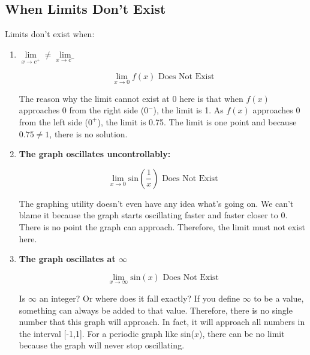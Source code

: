 \documentclass[../revisedMain.tex]{subfiles}
\begin{document}
\subsection{When Limits Don't Exist} Limits don't exist when:
\begin{enumerate}
\item \textbf{$\lim\limits_{x\to c^+} \neq \lim\limits_{x\to c^-}$}
\begin{center}
$$\lim_{x\to 0} f(x) \text{ Does Not Exist}$$
\end{center} 
\par The reason why the limit cannot exist at 0 here is that when $f(x)$ approaches 0 from the right side ($0^-$), the limit is 1. As $f(x)$ approaches 0 from the left side ($0^+$), the limit is 0.75. The limit is one point and because $0.75\neq 1$, there is no solution.
\item \textbf{The graph oscillates uncontrollably:}
\begin{center}
$$\lim_{x\to 0} \text{sin} \left ( \frac{1}{x} \right ) \text{ Does Not Exist}$$
\end{center} \par The graphing utility doesn't even have any idea what's going on. We can't blame it because the graph starts oscillating faster and faster closer to 0. There is no point the graph can approach. Therefore, the limit must not exist here.
\item \textbf{The graph oscillates at $\infty$}
\begin{center}
$$\lim_{x\to\infty} \text{sin}(x) \text{ Does Not Exist}$$
\end{center}
\par Is $\infty$ an integer? Or where does it fall exactly? If you define $\infty$ to be a value, something can always be added to that value. Therefore, there is no single number that this graph will approach. In fact, it will approach all numbers in the interval [-1,1]. For a periodic graph like sin($x$), there can be no limit because the graph will never stop oscillating.
\end{enumerate}
\end{document}
